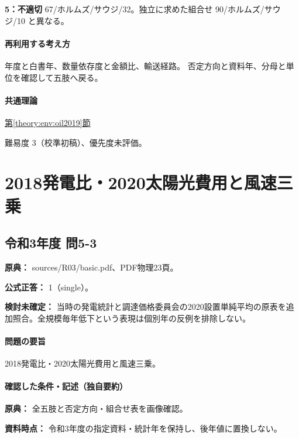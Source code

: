 \noindent\textbf{5：不適切} 67/ホルムズ/サウジ/32。独立に求めた組合せ 90/ホルムズ/サウジ/10 と異なる。\par

\paragraph{再利用する考え方} 年度と白書年、数量依存度と金額比、輸送経路。 否定方向と資料年、分母と単位を確認して五肢へ戻る。

\paragraph{共通理論} \hyperref[theory:env:oil2019]{第\ref*{theory:env:oil2019}節}

\par 難易度 3（校準初稿）、優先度未評価。

\section{2018発電比・2020太陽光費用と風速三乗}

\subsection{令和3年度 問5-3}
\label{q:r03-reg-basic-5-3}

\noindent\textbf{原典：} sources/R03/basic.pdf、PDF物理23頁。

\textbf{公式正答：} 1（single）。

\par\textbf{検討未確定：} 当時の発電統計と調達価格委員会の2020設置単純平均の原表を追加照合。全規模毎年低下という表現は個別年の反例を排除しない。

\paragraph{問題の要旨} 2018発電比・2020太陽光費用と風速三乗。

\paragraph{確認した条件・記述（独自要約）}\mbox{}\par

\noindent\textbf{原典：} 全五肢と否定方向・組合せ表を画像確認。\par

\noindent\textbf{資料時点：} 令和3年度の指定資料・統計年を保持し、後年値に置換しない。\par

